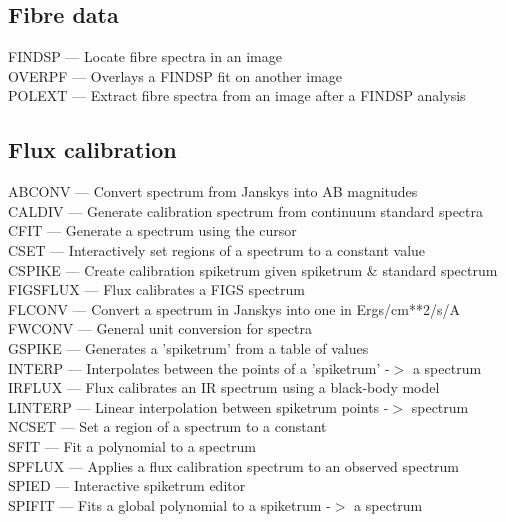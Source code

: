\documentclass[11pt,twoside]{article}
\newcommand{\htmlref}[2]{#1}
\begin{document}

\subsection{\label{classiffibres}Fibre data}

\htmlref{FINDSP}{FINDSP} --- Locate fibre spectra in an image\\
\htmlref{OVERPF}{OVERPF} --- Overlays a FINDSP fit on another image\\
\htmlref{POLEXT}{POLEXT} --- Extract fibre spectra from an image after a FINDSP analysis


\subsection{\label{classiffluxing}Flux calibration}

\htmlref{ABCONV}{ABCONV} --- Convert spectrum from Janskys into AB magnitudes\\
\htmlref{CALDIV}{CALDIV} --- Generate calibration spectrum from continuum standard spectra\\
\htmlref{CFIT}{CFIT} --- Generate a spectrum using the cursor\\
\htmlref{CSET}{CSET} --- Interactively set regions of a spectrum to a constant value\\
\htmlref{CSPIKE}{CSPIKE} --- Create calibration spiketrum given spiketrum \& standard spectrum\\
\htmlref{FIGSFLUX}{FIGSFLUX} --- Flux calibrates a FIGS spectrum\\
\htmlref{FLCONV}{FLCONV} --- Convert a spectrum in Janskys into one in Ergs/cm**2/s/A\\
\htmlref{FWCONV}{FWCONV} --- General unit conversion for spectra\\
\htmlref{GSPIKE}{GSPIKE} --- Generates a 'spiketrum' from a table of values\\
\htmlref{INTERP}{INTERP} --- Interpolates between the points of a 'spiketrum' -$>$ a spectrum\\
\htmlref{IRFLUX}{IRFLUX} --- Flux calibrates an IR spectrum using a black-body model\\
\htmlref{LINTERP}{LINTERP} --- Linear interpolation between spiketrum points -$>$ spectrum\\
\htmlref{NCSET}{NCSET} --- Set a region of a spectrum to a constant\\
\htmlref{SFIT}{SFIT} --- Fit a polynomial to a spectrum\\
\htmlref{SPFLUX}{SPFLUX} --- Applies a flux calibration spectrum to an observed spectrum\\
\htmlref{SPIED}{SPIED} --- Interactive spiketrum editor\\
\htmlref{SPIFIT}{SPIFIT} --- Fits a global polynomial to a spiketrum -$>$ a spectrum
\end{document}
